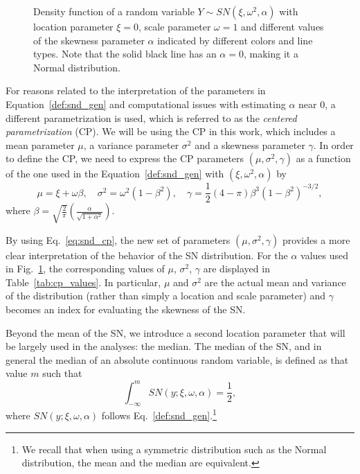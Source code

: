 \documentclass[11pt, oneside]{article}
\begin{document}
{\begin{figure}[htbp]
   \caption{Density function of a random variable $Y \sim SN(\xi, \omega^{2}, \alpha)$ with location parameter $\xi = 0$, scale parameter $\omega = 1$ and different values of the skewness parameter $\alpha$ indicated by different colors and line types. Note that the solid black line has an $\alpha = 0$, making it a Normal distribution.}
   \label{fig:SN.plot}
\end{figure}
%
For reasons related to the interpretation of the parameters in Equation~\eqref{def:snd_gen} and computational issues with estimating $\alpha$ near 0, a different parametrization is used, which is referred to as the \emph{centered parametrization} (CP).  We will be using the CP in this work, which includes a mean parameter $\mu$, a variance parameter $\sigma^2$ and a skewness parameter $\gamma$.  In order to define the CP, we need to express the CP parameters $(\mu, \sigma^2, \gamma)$ as a function of the one used in the Equation~\eqref{def:snd_gen} with $(\xi, \omega^2, \alpha)$ by
%
\begin{equation} \label{eq:snd_cp}
\mu = \xi + \omega \beta, \quad \sigma^{2} = \omega^{2}(1-\beta^2), \quad \gamma = \frac{1}{2}(4-\pi) \beta^{3}\left(1-\beta^2\right)^{-3/2},
\end{equation}
%
where $\beta = \sqrt{\frac{2}{\pi}}\left(\frac{\alpha}{\sqrt{1+\alpha^2}}\right)$.

By using Eq.~\eqref{eq:snd_cp}, the new set of parameters $(\mu, \sigma^2, \gamma)$ provides a more clear interpretation of the behavior of the SN distribution. For the $\alpha$ values used in Fig.~\ref{fig:SN.plot}, the corresponding values of $\mu$, $\sigma^2$, $\gamma$ are displayed in Table~\ref{tab:cp_values}.  In particular, $\mu$ and $\sigma^2$ are the actual mean and variance of the distribution (rather than simply a location and scale parameter) and $\gamma$ becomes an index for evaluating the skewness of the SN. 

Beyond the mean of the SN, we introduce a second location parameter that will be largely used in the analyses: the median. The median of the SN, and in general the median of an absolute continuous random variable, is defined as that value $m$ such that 
%
\begin{equation} \label{eq:snmed}
\int_{-\infty}^{m} SN(y;\xi, \omega, \alpha) = \frac{1}{2},
\end{equation}
%
where $SN(y;\xi, \omega, \alpha)$ follows Eq.~\eqref{def:snd_gen}.\footnote{We recall that when using a symmetric distribution such as the Normal distribution, the mean and the median are equivalent.}

}
\end{document}
